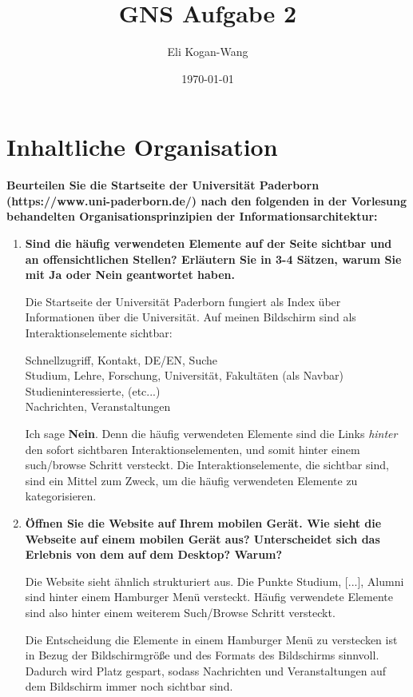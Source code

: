 \documentclass[a4paper,12pt]{article}
\title{GNS Aufgabe 2}
\author{Eli Kogan-Wang}
\date{\today}
\begin{document}

\section{Inhaltliche Organisation}
\textbf{Beurteilen Sie die Startseite der Universität Paderborn
  (https://www.uni-paderborn.de/) nach den folgenden in der Vorlesung behandelten
  Organisationsprinzipien der Informationsarchitektur:}
\begin{enumerate}[label=\alph*)]
  \item \textbf{Sind die häufig verwendeten Elemente auf der Seite sichtbar und an
          offensichtlichen Stellen? Erläutern Sie in 3-4 Sätzen, warum Sie mit Ja oder
          Nein geantwortet haben.}

        Die Startseite der Universität Paderborn fungiert als Index über Informationen über die Universität.
        Auf meinen Bildschirm sind als Interaktionselemente sichtbar:

        Schnellzugriff, Kontakt, DE/EN, Suche \\
        Studium, Lehre, Forschung, Universität, Fakultäten (als Navbar) \\
        Studieninteressierte, (etc...)\\
        Nachrichten, Veranstaltungen

        Ich sage \textbf{Nein}. Denn die häufig verwendeten Elemente sind die Links \textit{hinter} den
        sofort sichtbaren Interaktionselementen, und somit hinter einem such/browse Schritt versteckt.
        Die Interaktionselemente, die sichtbar sind, sind ein Mittel zum Zweck, um die häufig
        verwendeten Elemente zu kategorisieren.

  \item \textbf{Öffnen Sie die Website auf Ihrem mobilen Gerät. Wie sieht die Webseite auf
          einem mobilen Gerät aus? Unterscheidet sich das Erlebnis von dem auf dem
          Desktop? Warum?}

        Die Website sieht ähnlich strukturiert aus. Die Punkte Studium, [...], Alumni sind
        hinter einem Hamburger Menü versteckt. Häufig verwendete Elemente sind also
        hinter einem weiterem Such/Browse Schritt versteckt.

        Die Entscheidung die Elemente in einem Hamburger Menü zu verstecken ist
        in Bezug der Bildschirmgröße und des Formats des Bildschirms sinnvoll.
        Dadurch wird Platz gespart, sodass Nachrichten und Veranstaltungen
        auf dem Bildschirm immer noch sichtbar sind.


\end{enumerate}
\end{document}
